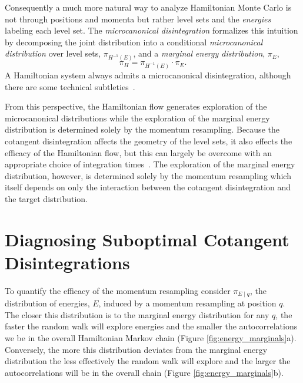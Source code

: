 \documentclass[stslayout]{imsart}
\newcommand{\sLS}{\ensuremath { H^{-1} \left( E \right) } }
\begin{document}
Consequently a much more natural way to analyze Hamiltonian
Monte Carlo is not through positions and momenta but rather
level sets and the \emph{energies} labeling each level set.  The
\emph{microcanonical disintegration} formalizes this intuition
by decomposing the joint distribution into a conditional 
\emph{microcanonical distribution} over level sets, $\pi_{\sLS}$, 
and a \emph{marginal energy distribution}, $\pi_{E}$,
%
\begin{equation*}
\pi_{H} = \pi_{\sLS} \cdot \pi_{E}.
\end{equation*}
%
A Hamiltonian system always admits a microcanonical disintegration,
although there are some technical subtleties~\citep{BetancourtEtAl:2014a}.

From this perspective, the Hamiltonian flow generates exploration 
of the microcanonical distributions while the exploration of the marginal 
energy distribution is determined solely by the momentum resampling.
Because the cotangent disintegration affects the geometry of the level sets,
it also effects the efficacy of the Hamiltonian flow, but this can largely be
overcome with an appropriate choice of integration 
times~\citep{Betancourt:2016}.  The exploration of the marginal energy 
distribution, however, is determined solely by the momentum resampling 
which itself depends on only the interaction between the cotangent 
disintegration and the target distribution.

\section{Diagnosing Suboptimal Cotangent Disintegrations}

To quantify the efficacy of the momentum resampling consider $\pi_{E \mid q}$, 
the distribution of energies, $E$, induced by a momentum resampling at 
position $q$.  The closer this distribution is to the marginal energy distribution 
for any $q$, the faster the random walk will explore energies and the smaller 
the autocorrelations we be in the overall Hamiltonian Markov chain
(Figure \ref{fig:energy_marginals}a). Conversely, the more this distribution 
deviates from the marginal energy distribution the less effectively the random 
walk will explore and the larger the autocorrelations will be in the overall chain 
(Figure \ref{fig:energy_marginals}b).
\end{document}
